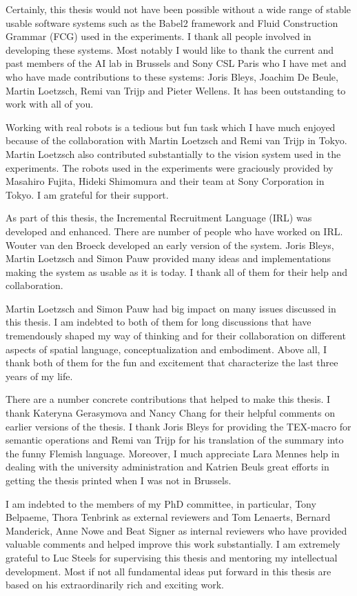Certainly, this thesis would not have been possible without a
wide range of stable usable software systems such as
the Babel2 framework and Fluid Construction Grammar (FCG)
used in the experiments. I thank all people involved in developing these
systems. Most notably I would like to thank the current and past members
of the AI lab in Brussels and Sony CSL Paris who I have met
and who have made contributions to these systems: Joris Bleys,
Joachim De Beule, Martin Loetzsch, Remi van Trijp and Pieter Wellens. 
It has been outstanding to work with all of you.

Working with real robots is a tedious but fun task which I have 
much enjoyed because of the collaboration with Martin Loetzsch 
and Remi van Trijp in Tokyo. Martin Loetzsch also contributed
substantially to the vision system used in the experiments.
The robots used in the experiments were graciously provided
by Masahiro Fujita, Hideki Shimomura and their team at
Sony Corporation in Tokyo. I am grateful for their support.

As part of this thesis, the Incremental Recruitment Language (IRL) 
was developed and enhanced. There are number of people who have 
worked on IRL. Wouter van den Broeck developed an early version of the system.
Joris Bleys, Martin Loetzsch and Simon Pauw provided many
ideas and implementations making the system as usable as it is today.
I thank all of them for their help and collaboration.

Martin Loetzsch and Simon Pauw had big impact
on many issues discussed in this thesis. I am indebted to both
of them for long discussions that have tremendously shaped my way of thinking 
and for their collaboration on different aspects of spatial language, 
conceptualization and embodiment. Above all, I thank both of them 
for the fun and excitement that characterize the last three 
years of my life.

There are a number concrete contributions that
helped to make this thesis. I thank Kateryna Gerasymova
and Nancy Chang for their helpful comments on earlier versions of
the thesis. I thank Joris Bleys for providing the TEX-macro
for semantic operations and Remi van Trijp for his translation
of the summary into the funny Flemish language. Moreover, I much
appreciate Lara Mennes help in dealing with the university
administration and Katrien Beuls great efforts in getting the thesis
printed when I was not in Brussels. 

I am indebted to the members of my PhD committee, in particular, 
Tony Belpaeme, Thora Tenbrink as external reviewers and Tom Lenaerts, 
Bernard Manderick, Anne Nowe and Beat Signer as internal reviewers
who have provided valuable comments and helped improve this work
substantially. I am extremely grateful to Luc Steels for supervising this thesis 
and mentoring my intellectual development. Most if not all fundamental 
ideas put forward in this thesis are based on his extraordinarily rich 
and exciting work.

